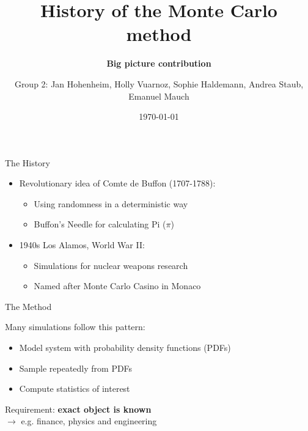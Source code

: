 \documentclass[english]{beamer}\usepackage[]{graphicx}\usepackage[]{xcolor}
\title[Monte Carlo method]{History of the Monte Carlo method}
\subtitle{\textbf{Big picture contribution}}
\author{Group 2: Jan Hohenheim, Holly Vuarnoz, Sophie Haldemann,
Andrea Staub, Emanuel Mauch}
\date{\today}
\begin{document}
\maketitle


\begin{frame}{The History}

\begin{itemize}\setlength\itemsep{1em} %
    \item Revolutionary idea of Comte de Buffon (1707-1788):
    \begin{itemize}
      \item Using randomness in a deterministic way
      \item Buffon's Needle for calculating Pi (\(\pi\)) 
    \end{itemize}
    \item 1940s Los Alamos, World War II:
    \begin{itemize}
      \item Simulations for nuclear weapons research
      \item Named after Monte Carlo Casino in Monaco
    \end{itemize}
\end{itemize}

\end{frame}


\begin{frame}{The Method}

Many simulations follow this pattern:
\begin{itemize}
  \item Model system with probability density functions (PDFs)
  \item Sample repeatedly from PDFs
  \item Compute statistics of interest
\end{itemize}

Requirement: \textbf{exact object is known}\\
$\rightarrow$ e.g. finance, physics and engineering
\end{frame}
\end{document}
